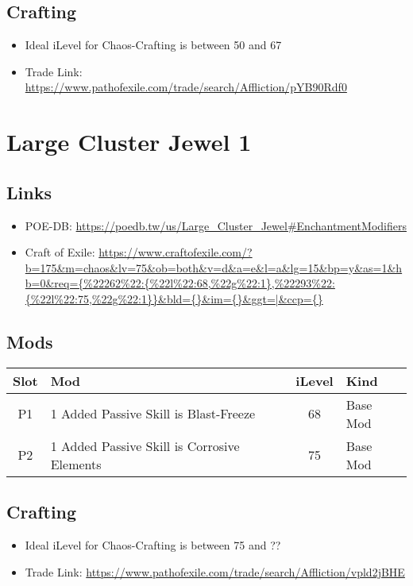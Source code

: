 \subsection{Crafting}
\begin{itemize}
	\item Ideal iLevel for Chaos-Crafting is between 50 and 67
	\item Trade Link: \url{https://www.pathofexile.com/trade/search/Affliction/pYB90Rdf0}
\end{itemize}

\section{Large Cluster Jewel 1}
\subsection{Links}
\begin{itemize}
	\item POE-DB: \url{https://poedb.tw/us/Large_Cluster_Jewel#EnchantmentModifiers}
	\item Craft of Exile: \url{https://www.craftofexile.com/?b=175&m=chaos&lv=75&ob=both&v=d&a=e&l=a&lg=15&bp=y&as=1&hb=0&req={%
\end{itemize}
\subsection{Mods}
\begin{tabular}{|c|l|c|l|}
	\hline
	Slot&Mod&iLevel&Kind\\\hline
	P1& 1 Added Passive Skill is Blast-Freeze&68& Base Mod \\\hline
	P2& 1 Added Passive Skill is Corrosive Elements&75& Base Mod \\\hline
\end{tabular}

\subsection{Crafting}
\begin{itemize}
	\item Ideal iLevel for Chaos-Crafting is between 75 and ??
	\item Trade Link: \url{https://www.pathofexile.com/trade/search/Affliction/vpld2jBHE}
\end{itemize}